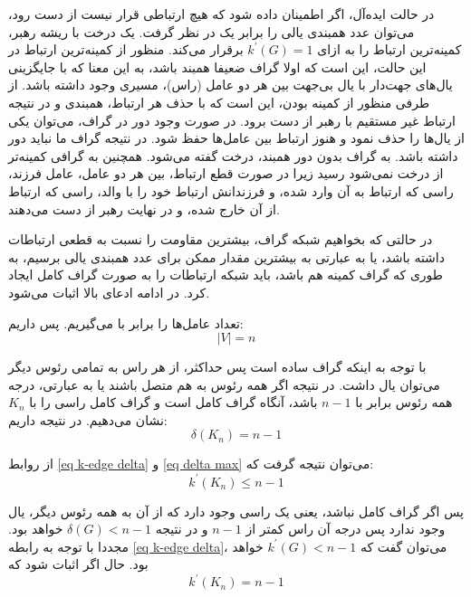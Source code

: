 در حالت ایده‌آل، اگر اطمینان داده شود که هیچ ارتباطی قرار نیست از دست رود، می‌توان عدد همبندی یالی را برابر یک در نظر گرفت. یک درخت با ریشه رهبر، کمینه‌ترین ارتباط را به ازای 
$k^\prime(G) = 1$ 
برقرار می‌کند. منظور از کمینه‌ترین ارتباط در این حالت، این است که اولا گراف ضعیفا همبند باشد، به این معنا که با جایگزینی یال‌های جهت‌دار با یال بی‌جهت بین هر دو عامل (راس)، مسیری وجود داشته باشد. از طرفی منظور از کمینه بودن، این است که با حذف هر ارتباط، همبندی و در نتیجه ارتباط غیر مستقیم با رهبر از دست برود. در صورت وجود دور در گراف، می‌توان یکی از یال‌ها را حذف نمود و هنوز ارتباط بین عامل‌ها حفظ شود. در نتیجه گراف ما نباید دور داشته باشد. به گراف بدون دور همبند، درخت گفته می‌شود. همچنین به گرافی کمینه‌تر از درخت نمی‌شود رسید زیرا در صورت قطع ارتباط، بین هر دو عامل، عامل فرزند، راسی که ارتباط به آن وارد شده، و فرزندانش ارتباط خود را با والد، راسی که ارتباط از آن خارج شده، و در نهایت رهبر از دست می‌دهند.

در حالتی که بخواهیم شبکه گراف، بیشترین مقاومت را نسبت به قطعی ارتباطات داشته باشد، یا به عبارتی به بیشترین مقدار ممکن برای عدد همبندی یالی برسیم، به طوری که گراف کمینه هم باشد، باید شبکه ارتباطات را به صورت گراف کامل ایجاد کرد. در ادامه ادعای بالا اثبات می‌شود.

تعداد عامل‌ها را برابر با  می‌گیریم. پس داریم:
\begin{equation}
|V| = n
\end{equation}

با توجه به اینکه گراف ساده است پس حداکثر، از هر راس به تمامی رئوس دیگر می‌توان یال داشت. در نتیجه اگر همه رئوس به هم متصل باشند یا به عبارتی، درجه همه رئوس برابر با 
$n-1$
 باشد، آنگاه گراف کامل است و گراف کامل  راسی را با 
$K_n$ 
نشان می‌دهیم. در نتیجه داریم:
\begin{equation}\label{eq delta max}
\delta(K_n) = n-1
\end{equation}

از روابط \ref{eq k-edge delta} و \ref{eq delta max} می‌توان نتیجه گرفت که:
\begin{equation}\label{eq connectivity max}
k^\prime(K_n) \leq n-1
\end{equation}

پس اگر گراف کامل نباشد، یعنی یک راسی وجود دارد که از آن به همه رئوس دیگر، یال وجود ندارد پس درجه آن راس کمتر از 
$n-1$
 و در نتیجه 
$\delta(G) < n-1$ 
خواهد بود. مجددا با توجه به رابطه \ref{eq k-edge delta}، می‌توان گفت که 
$k^\prime(G) < n-1$
خواهد بود. حال اگر اثبات شود که 
\begin{equation}\label{eq edge complete graph}
k^\prime(K_n) = n-1
\end{equation}
 
